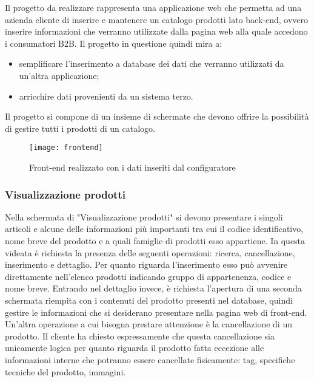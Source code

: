 Il progetto da realizzare rappresenta una applicazione web che permetta ad una azienda cliente di inserire e mantenere un catalogo prodotti lato back-end, ovvero inserire informazioni che verranno utilizzate dalla pagina web alla quale accedono i consumatori B2B. 
Il progetto in questione quindi mira a:
\begin{itemize}
	\item semplificare l'inserimento a database dei dati che verranno utilizzati da un'altra applicazione;
	\item arricchire dati provenienti da un sistema terzo.
\end{itemize}

Il progetto si compone di un insieme di schermate che devono offrire la possibilità di gestire tutti i prodotti di un catalogo. 


\begin{figure}[!h] 
	\centering 
	\texttt{[image: frontend]} 
	\caption{Front-end realizzato con i dati inseriti dal configuratore}
	\label{ImgFrontend}
\end{figure}

\subsubsection{Visualizzazione prodotti}
Nella schermata di "Visualizzazione prodotti" si devono presentare i singoli articoli e alcune delle informazioni più importanti tra cui il codice identificativo, nome breve del prodotto e a quali famiglie di prodotti esso appartiene. In questa videata è richiesta la presenza delle seguenti operazioni: ricerca, cancellazione, inserimento e dettaglio.
Per quanto riguarda l'inserimento esso può avvenire direttamente nell'elenco prodotti indicando gruppo di appartenenza, codice e nome breve.
Entrando nel dettaglio invece, è richiesta l'apertura di una seconda schermata riempita con i contenuti del prodotto presenti nel database, quindi gestire le informazioni che si desiderano presentare nella pagina web di front-end.
Un'altra operazione a cui bisogna prestare attenzione è la cancellazione di un prodotto. Il cliente ha chiesto espressamente che questa cancellazione sia unicamente logica per quanto riguarda il prodotto fatta eccezione alle informazioni interne che potranno essere cancellate fisicamente: tag, specifiche tecniche del prodotto, immagini.

